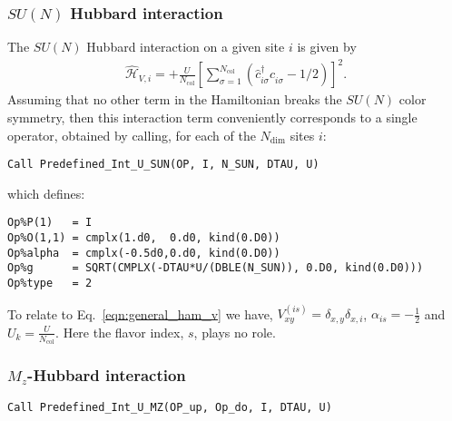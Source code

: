 \subsubsection{$SU(N)$ Hubbard interaction}
\label{Hubbard_SUN_HS.eq}
The $SU(N)$ Hubbard interaction on a given site $i$ is given by 
\begin{align}
\hat{\mathcal{H}}_{V,i} =
+ \frac{U}{N_{\mathrm{col}}}\left[
\sum\limits_{\sigma=1}^{N_{\mathrm{col}}}
\left(  \hat{c}^{\dagger}_{i \sigma} \hat{c}^{\phantom\dagger}_{i\sigma}  -1/2 \right) \right]^{2}.
\end{align} 
Assuming that no other term in the Hamiltonian breaks the $SU(N) $ color symmetry, then this interaction term conveniently corresponds to  a single operator, obtained by calling, for each of the $N_{\mathrm{dim}}$ sites $i$:
\begin{lstlisting}[style=fortran]
Call Predefined_Int_U_SUN(OP, I, N_SUN, DTAU, U)
\end{lstlisting}
which defines:

\begin{lstlisting}[style=fortran]
Op%P(1)   = I
Op%O(1,1) = cmplx(1.d0,  0.d0, kind(0.D0))
Op%alpha  = cmplx(-0.5d0,0.d0, kind(0.D0))
Op%g      = SQRT(CMPLX(-DTAU*U/(DBLE(N_SUN)), 0.D0, kind(0.D0))) 
Op%type   = 2

\end{lstlisting}

To relate to  Eq.~\eqref{eqn:general_ham_v} we have,   $V_{x y}^{(is)} =  \delta_{x,y} \delta_{x,i}$, $\alpha_{is} = -\frac{1}{2}$ and $U_{k} =  \frac{U}{N_{\mathrm{col}}}$.   Here  the flavor index, $s$,  plays no role. 


\subsubsection{$M_z$-Hubbard interaction}

\begin{lstlisting}[style=fortran]
Call Predefined_Int_U_MZ(OP_up, Op_do, I, DTAU, U)
\end{lstlisting}

